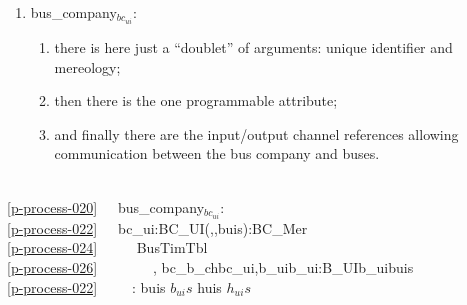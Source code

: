 {

\begin{enumerate}\setei
\item \label{p-process-020} \textsf{bus\_company$_{bc_{ui}}$}:
\begin{enumerate}
\item \label{p-process-022} there is here just a ``doublet''  of
                          arguments: unique identifier and mereology;
\item \label{p-process-024} then there is the one programmable attribute;
\item \label{p-process-026} and finally there are the input/output
                          channel references allowing communication between
                          the bus company and buses.
\end{enumerate}
\savei\end{enumerate}\footsize\sf\HHHH
\pos{\psno}{\mnewfoil}
\bp
{}\\
\ref{p-process-020}\ \ \ bus\_company$_{bc_{ui}}$: \\
\ref{p-process-022}\ \ \ bc\_ui:BC\_UI{\TIMES}({\UNDERLINE},{\UNDERLINE},buis):BC\_Mer\\
\ref{p-process-024}\ \ \ \ \ {\RIGHTARROW} BusTimTbl\\
\ref{p-process-026}\ \ \ \ \ \ \ \ , {\LBRACE}bc\_b\_ch{\LBRACKET}bc\_ui,b\_ui{\RBRACKET}{\BAR}b\_ui:B\_UI{\RDOT}b\_ui{\ISIN}buis{\RBRACE} \\
\ref{p-process-022}\ \ \ \ \ : buis {\EQ} $b_{ui}s$ {\WEDGE} huis {\EQ} $h_{ui}s$
\ep
\pos{\psno}{\mnewfoil}


}
